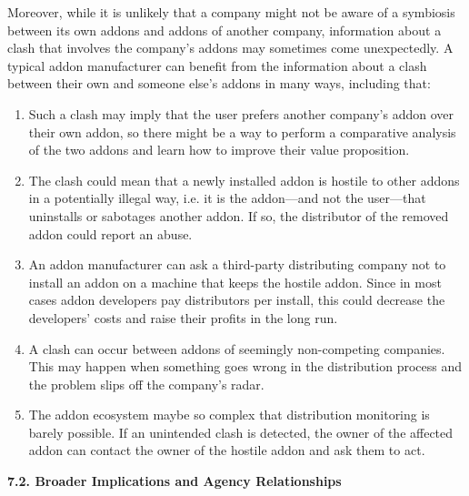 \documentclass{article} %
\begin{document}
Moreover, while it is unlikely that a company might not be aware of a symbiosis between its own addons and addons of another company, information about a clash that involves the company's addons may sometimes come unexpectedly. A typical addon manufacturer can benefit from the information about a clash between their own and someone else's addons in many ways, including that:  

\begin{enumerate}
\item  Such a clash may imply that the user prefers another company's addon over their own addon, so there might be a way to perform a comparative analysis of the two addons and learn how to improve their value proposition. 

\item  The clash could mean that a newly installed addon is hostile to other addons in a potentially illegal way, i.e. it is the addon---and not the user---that uninstalls or sabotages another addon. If so, the distributor of the removed addon could report an abuse. 

\item  An addon manufacturer can ask a third-party distributing company not to install an addon on a machine that keeps the hostile addon. Since in most cases addon developers pay distributors per install, this could decrease the developers' costs and raise their profits in the long run. 

\item  A clash can occur between addons of seemingly non-competing companies. This may happen when something goes wrong in the distribution process and the problem slips off the company's radar. 

\item  The addon ecosystem maybe so complex that distribution monitoring is barely possible. If an unintended clash is detected, the owner of the affected addon can contact the owner of the hostile addon and ask them to act. 
\end{enumerate}

\noindent 

\noindent \textbf{7.2. Broader Implications and Agency Relationships  }
\end{document}
